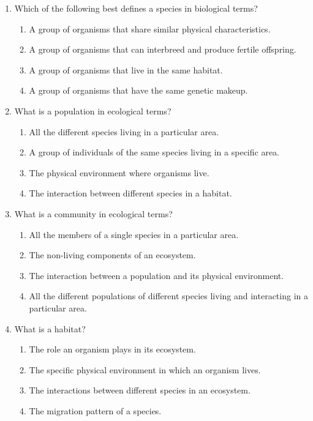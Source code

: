 \documentclass{article}
\begin{document}
\begin{enumerate}
    \item Which of the following best defines a species in biological terms?
    \begin{enumerate}
        \item A group of organisms that share similar physical characteristics.
        \item A group of organisms that can interbreed and produce fertile offspring.
        \item A group of organisms that live in the same habitat.
        \item A group of organisms that have the same genetic makeup.
    \end{enumerate}

    \item What is a population in ecological terms?
    \begin{enumerate}
        \item All the different species living in a particular area.
        \item A group of individuals of the same species living in a specific area.
        \item The physical environment where organisms live.
        \item The interaction between different species in a habitat.
    \end{enumerate}

    \item What is a community in ecological terms?
    \begin{enumerate}
        \item All the members of a single species in a particular area.
        \item The non-living components of an ecosystem.
        \item The interaction between a population and its physical environment.
        \item All the different populations of different species living and interacting in a particular area.
    \end{enumerate}

    \item What is a habitat?
    \begin{enumerate}
        \item The role an organism plays in its ecosystem.
        \item The specific physical environment in which an organism lives.
        \item The interactions between different species in an ecosystem.
        \item The migration pattern of a species.
    \end{enumerate}


\end{enumerate}
\end{document}
